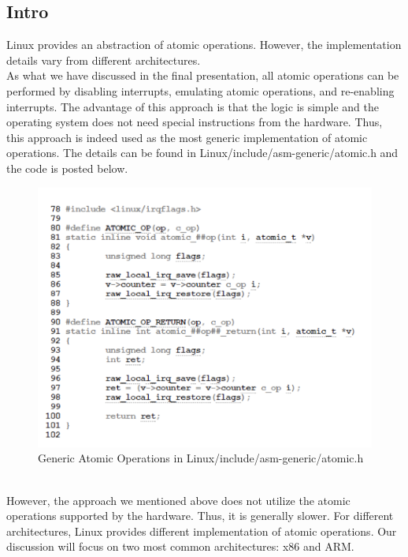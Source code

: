 \documentclass[10pt]{sigplanconf}
\begin{document}
\subsection{Intro}
Linux provides an abstraction of atomic operations. However, the implementation details vary from different architectures.\\
As what we have discussed in the final presentation, all atomic operations can be performed by disabling interrupts, emulating atomic operations, and re-enabling interrupts. The advantage of this approach is that the logic is simple and the operating system does not need special instructions from the hardware. Thus, this approach is indeed used as the most generic implementation of atomic operations. The details can be found in Linux/include/asm-generic/atomic.h and the code is posted below.\\
\begin{figure}[h!]
  \centering
  \includegraphics[scale=0.45]{Linux_generic_atomic.png}
  \caption{Generic Atomic Operations in Linux/include/asm-generic/atomic.h}
  \label{fig:ec}
\end{figure}\\
However, the approach we mentioned above does not utilize the atomic operations supported by the hardware. Thus, it is generally slower. For different architectures, Linux provides different implementation of atomic operations. Our discussion will focus on two most common architectures: x86 and ARM.\\
\end{document}

